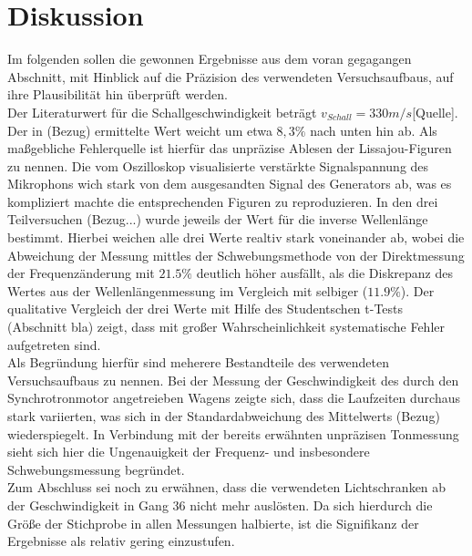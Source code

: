 \section{Diskussion}

Im folgenden sollen die gewonnen Ergebnisse aus dem voran gegagangen Abschnitt, mit Hinblick auf die Präzision
des verwendeten Versuchsaufbaus, auf ihre Plausibilität hin überprüft werden.  \\
Der Literaturwert für die Schallgeschwindigkeit beträgt $v_{Schall} = 330 m/s$[Quelle]. Der in (Bezug) ermittelte Wert weicht
um etwa $8,3 \% $ nach unten hin ab. Als maßgebliche Fehlerquelle ist hierfür das unpräzise Ablesen der Lissajou-Figuren zu nennen. Die
vom Oszilloskop visualisierte verstärkte Signalspannung des Mikrophons wich stark von dem ausgesandten Signal des Generators ab, was es kompliziert
machte die entsprechenden Figuren zu reproduzieren.
In den drei Teilversuchen (Bezug...) wurde jeweils der Wert für die inverse Wellenlänge bestimmt. Hierbei weichen alle drei Werte realtiv stark
voneinander ab, wobei die Abweichung der Messung mittles der Schwebungsmethode von der Direktmessung der Frequenzänderung mit $21.5 \%$ deutlich höher ausfällt,
als die Diskrepanz des Wertes aus der Wellenlängenmessung im Vergleich mit selbiger ($11.9 \% $). Der qualitative Vergleich der drei Werte mit Hilfe des Studentschen t-Tests (Abschnitt bla) zeigt, dass mit großer
Wahrscheinlichkeit systematische Fehler aufgetreten sind. \\
Als Begründung hierfür sind meherere Bestandteile des verwendeten Versuchsaufbaus zu nennen.
Bei der Messung der Geschwindigkeit des durch den Synchrotronmotor angetreieben Wagens zeigte sich, dass die Laufzeiten
durchaus stark variierten, was sich in der Standardabweichung des Mittelwerts (Bezug) wiederspiegelt. In Verbindung mit der bereits erwähnten
unpräzisen Tonmessung sieht sich hier die Ungenauigkeit der Frequenz- und insbesondere Schwebungsmessung begründet. \\
Zum Abschluss sei noch zu erwähnen, dass die verwendeten Lichtschranken ab der Geschwindigkeit in Gang 36 nicht mehr auslösten. Da sich hierdurch
die Größe der Stichprobe in allen Messungen halbierte, ist die Signifikanz der Ergebnisse als relativ gering einzustufen.
